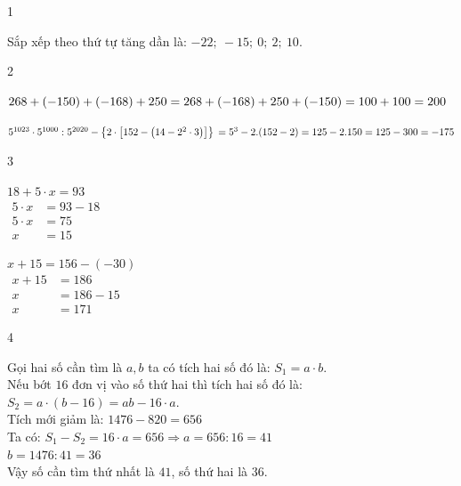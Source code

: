 \begin{Solbook}{1}
 \par \noindent Sắp xếp theo thứ tự tăng dần là: $-22;\ -15;\ 0;\ 2;\ 10$. \hfill \qedEX 
\end{Solbook}
\begin{Solbook}{2}
 \par \noindent  \begin {listEX}[2] \item $268+(-150)+(-168)+250\\=268+(-168)+250+(-150)\\=100+100=200$ \item $5^{1023} \cdot 5^{1000}: 5^{2020}-\left \{2 \cdot \left [152-\left (14-2^{2} \cdot 3\right )\right ]\right \}\\=5^{3}-{2.(152-2)}\\=125-2.150=125-300=-175$ \end {listEX}  \hfill \qedEX 
\end{Solbook}
\begin{Solbook}{3}
 \par \noindent  \begin {listEX}[2] \item $18+5\cdot x =93$\\ \hspace *{1 cm}$\begin {aligned} 5\cdot x&=93-18\\ 5\cdot x&=75 \\ x&=15 \end {aligned}$ \item $x+15 =156-(-30)$\\ $\begin {aligned} x+15&=186\\ x&=186-15 \\ x&=171\end {aligned}$ \end {listEX}  \hfill \qedEX 
\end{Solbook}
\begin{Solbook}{4}
 \par \noindent Gọi hai số cần tìm là $a, b$ ta có tích hai số đó là: $S_1=a \cdot b$.\\ Nếu bớt $16$ đơn vị vào số thứ hai thì tích hai số đó là: $S_2=a \cdot (b-16)=a b-16\cdot a$.\\ Tích mới giảm là: $1476-820=656$\\ Ta có: $S_1-S_2=16\cdot a=656 \Rightarrow a=656: 16=41$\\ $b=1476: 41=36$\\ Vậy số cần tìm thứ nhất là $41$, số thứ hai là $36$. \hfill \qedEX 
\end{Solbook}
